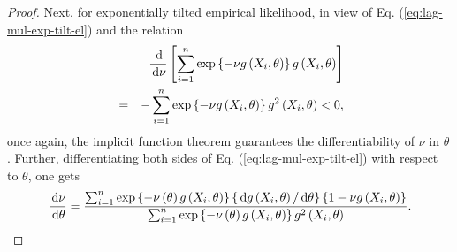 \begin{proof}
Next, for exponentially tilted empirical likelihood, in view of Eq. (\ref{eq:lag-mul-exp-tilt-el})
and the relation 
\begin{eqnarray*}
 &  & \frac{\,\mathrm{d}}{\,\mathrm{d}\nu}\left[\sum_{i=1}^{n}\exp\left\{ -\nu g\left(X_{i},\theta\right)\right\} g\left(X_{i},\theta\right)\right]\\
 & = & -\sum_{i=1}^{n}\exp\left\{ -\nu g\left(X_{i},\theta\right)\right\} g^{2}\left(X_{i},\theta\right)<0,
\end{eqnarray*}
 once again, the implicit function theorem guarantees the differentiability
of $\nu$ in $\theta$. Further, differentiating both sides of Eq. (\ref{eq:lag-mul-exp-tilt-el})
with respect to $\theta$, one gets 
\begin{equation}
\frac{\,\mathrm{d}\nu}{\,\mathrm{d}\theta}=\frac{\sum_{i=1}^{n}\exp\left\{ -\nu\left(\theta\right)g\left(X_{i},\theta\right)\right\} \left\{ \,\mathrm{d} g\left(X_{i},\theta\right)/\,\mathrm{d}\theta\right\} \left\{ 1-\nu g\left(X_{i},\theta\right)\right\} }{\sum_{i=1}^{n}\exp\left\{ -\nu\left(\theta\right)g\left(X_{i},\theta\right)\right\} g^{2}\left(X_{i},\theta\right)}.\label{eq:first-deri-lag-mult-exp-tilted-el}
\end{equation}



\end{proof}
